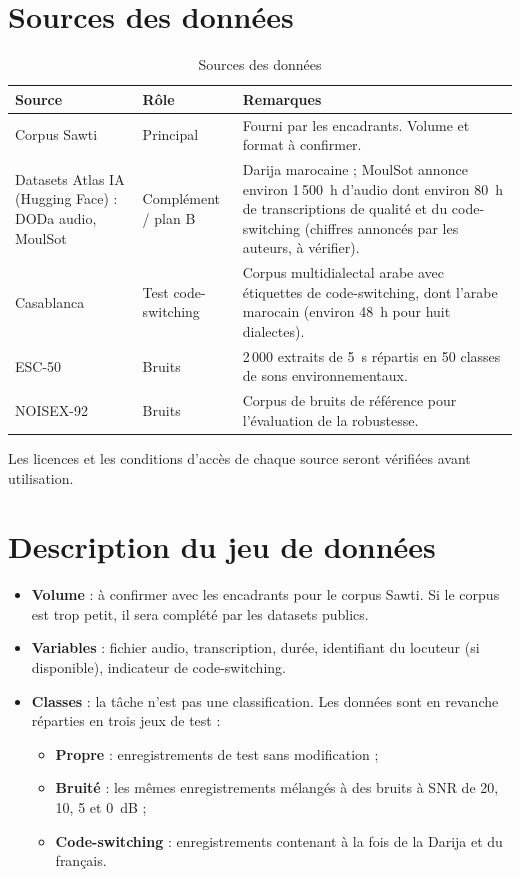 \documentclass[12pt,a4paper]{report}
\begin{document}
\section{Sources des données}
\begin{table}[h]
  \centering
  \small
  \begin{tabularx}{\textwidth}{p{3.3cm}p{2.6cm}X}
    \toprule
    \textbf{Source} & \textbf{Rôle} & \textbf{Remarques} \\
    \midrule
    Corpus Sawti & Principal & Fourni par les encadrants. Volume et format
    à confirmer. \\
    \addlinespace
    Datasets Atlas IA (Hugging Face) : DODa audio, MoulSot
    & Complément / plan B & Darija marocaine ; MoulSot annonce environ 1\,500~h
    d'audio dont environ 80~h de transcriptions de qualité et du code-switching
    (chiffres annoncés par les auteurs, à vérifier). \\
    \addlinespace
    Casablanca & Test code-switching & Corpus multidialectal arabe avec étiquettes
    de code-switching, dont l'arabe marocain (environ 48~h pour huit dialectes). \\
    \addlinespace
    ESC-50 & Bruits & 2\,000 extraits de 5~s répartis en 50 classes de sons
    environnementaux. \\
    \addlinespace
    NOISEX-92 & Bruits & Corpus de bruits de référence pour l'évaluation de la
    robustesse. \\
    \bottomrule
  \end{tabularx}
  \caption{Sources des données}
  \label{tab:sources}
\end{table}

Les licences et les conditions d'accès de chaque source seront vérifiées avant
utilisation.

\section{Description du jeu de données}
\begin{itemize}
  \item \textbf{Volume} : à confirmer avec les encadrants pour le corpus Sawti.
        Si le corpus est trop petit, il sera complété par les datasets publics.
  \item \textbf{Variables} : fichier audio, transcription, durée, identifiant du
        locuteur (si disponible), indicateur de code-switching.
  \item \textbf{Classes} : la tâche n'est pas une classification. Les données sont
        en revanche réparties en trois jeux de test :
        \begin{itemize}
          \item \textbf{Propre} : enregistrements de test sans modification ;
          \item \textbf{Bruité} : les mêmes enregistrements mélangés à des bruits
                à SNR de 20, 10, 5 et 0~dB ;
          \item \textbf{Code-switching} : enregistrements contenant à la fois de
                la Darija et du français.
        \end{itemize}
\end{itemize}
\end{document}
